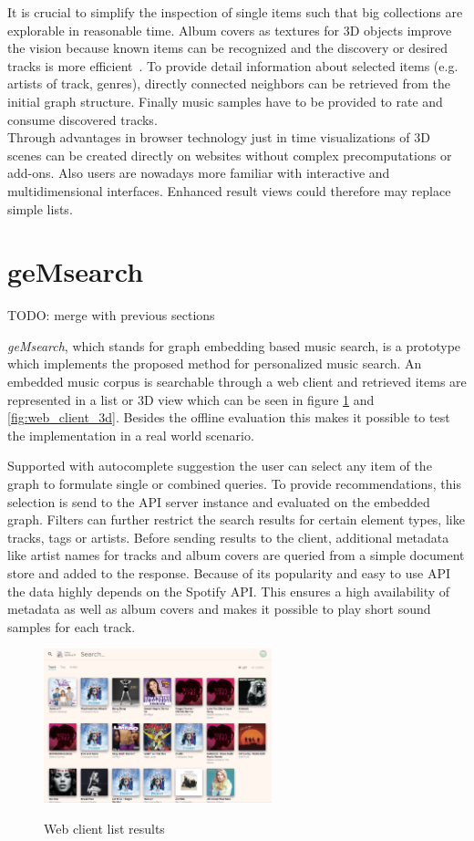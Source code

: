 \documentclass[sigconf]{acmart}
\begin{document}
It is crucial to simplify the inspection of single items such that big collections are explorable in reasonable time. Album covers as textures for 3D objects improve the vision because known items can be recognized and the discovery or desired tracks is more efficient~\cite{libeks2011you}. To provide detail information about selected items (e.g. artists of track, genres), directly connected neighbors can be retrieved from the initial graph structure. Finally music samples have to be provided to rate and consume discovered tracks. \\

Through advantages in browser technology just in time visualizations of 3D scenes can be created directly on websites without complex precomputations or add-ons. Also users are nowadays more familiar with interactive and multidimensional interfaces. Enhanced result views could therefore may replace simple lists.

\section{geMsearch}
TODO: merge with previous sections 

\emph{geMsearch}, which stands for graph embedding based music search, is a prototype which implements the proposed method for personalized music search. An embedded music corpus is searchable through a web client and retrieved items are represented in a list or 3D view which can be seen in figure \ref{fig:web_client} and \ref{fig:web_client_3d}. Besides the offline evaluation this makes it possible to test the implementation in a real world scenario. 

Supported with autocomplete suggestion the user can select any item of the graph to formulate single or combined queries. To provide recommendations, this selection is send to the API server instance and evaluated on the embedded graph. Filters can further restrict the search results for certain element types, like tracks, tags or artists. Before sending results to the client, additional metadata like artist names for tracks and album covers are queried from a simple document store and added to the response. Because of its popularity and easy to use API the data highly depends on the Spotify API. This ensures a high availability of metadata as well as album covers and makes it possible to play short sound samples for each track.\\

\begin{figure}[ht]
	{\includegraphics[width=250px]{web_client.png}}	
	\caption{Web client list results}
	\label{fig:web_client}
\end{figure}
\end{document}
